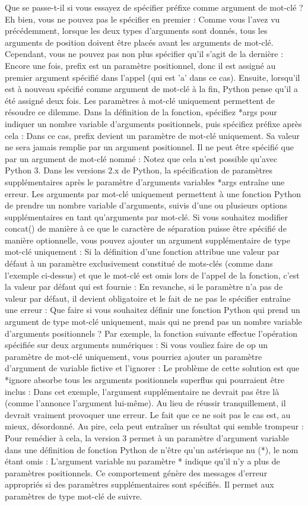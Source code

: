 Que se passe-t-il si vous essayez de spécifier préfixe comme argument de mot-clé ?  Eh bien, vous ne pouvez pas le spécifier en premier :
Comme vous l'avez vu précédemment, lorsque les deux types d'arguments sont donnés, tous les arguments de position doivent être placés avant les arguments de mot-clé.
Cependant, vous ne pouvez pas non plus spécifier qu'il s'agit de la dernière :
Encore une fois, prefix est un paramètre positionnel, donc il est assigné au premier argument spécifié dans l'appel (qui est 'a' dans ce cas).  Ensuite, lorsqu'il est à nouveau spécifié comme argument de mot-clé à la fin, Python pense qu'il a été assigné deux fois.
Les paramètres à mot-clé uniquement permettent de résoudre ce dilemme.  Dans la définition de la fonction, spécifiez *args pour indiquer un nombre variable d'arguments positionnels, puis spécifiez préfixe après cela :
Dans ce cas, prefix devient un paramètre de mot-clé uniquement.  Sa valeur ne sera jamais remplie par un argument positionnel.  Il ne peut être spécifié que par un argument de mot-clé nommé :
Notez que cela n'est possible qu'avec Python 3.  Dans les versions 2.x de Python, la spécification de paramètres supplémentaires après le paramètre d'arguments variables *args entraîne une erreur.
Les arguments par mot-clé uniquement permettent à une fonction Python de prendre un nombre variable d'arguments, suivis d'une ou plusieurs options supplémentaires en tant qu'arguments par mot-clé.  Si vous souhaitez modifier concat() de manière à ce que le caractère de séparation puisse être spécifié de manière optionnelle, vous pouvez ajouter un argument supplémentaire de type mot-clé uniquement :
Si la définition d'une fonction attribue une valeur par défaut à un paramètre exclusivement constitué de mots-clés (comme dans l'exemple ci-dessus) et que le mot-clé est omis lors de l'appel de la fonction, c'est la valeur par défaut qui est fournie :
En revanche, si le paramètre n'a pas de valeur par défaut, il devient obligatoire et le fait de ne pas le spécifier entraîne une erreur :
Que faire si vous souhaitez définir une fonction Python qui prend un argument de type mot-clé uniquement, mais qui ne prend pas un nombre variable d'arguments positionnels ?  Par exemple, la fonction suivante effectue l'opération spécifiée sur deux arguments numériques :
Si vous vouliez faire de op un paramètre de mot-clé uniquement, vous pourriez ajouter un paramètre d'argument de variable fictive et l'ignorer :
Le problème de cette solution est que *ignore absorbe tous les arguments positionnels superflus qui pourraient être inclus :
Dans cet exemple, l'argument supplémentaire ne devrait pas être là (comme l'annonce l'argument lui-même).  Au lieu de réussir tranquillement, il devrait vraiment provoquer une erreur.  Le fait que ce ne soit pas le cas est, au mieux, désordonné.  Au pire, cela peut entraîner un résultat qui semble trompeur :
Pour remédier à cela, la version 3 permet à un paramètre d'argument variable dans une définition de fonction Python de n'être qu'un astérisque nu (*), le nom étant omis :
L'argument variable nu paramètre * indique qu'il n'y a plus de paramètres positionnels. Ce comportement génère des messages d'erreur appropriés si des paramètres supplémentaires sont spécifiés. Il permet aux paramètres de type mot-clé de suivre.
